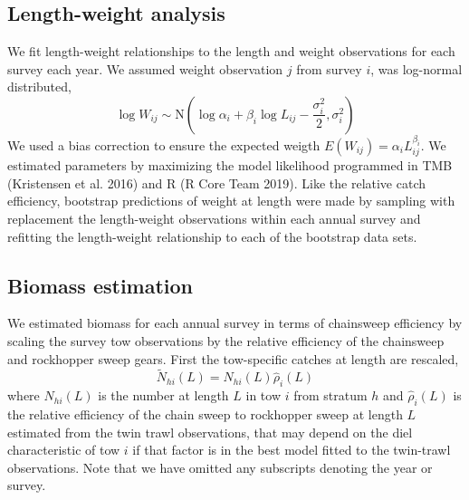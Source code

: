 \documentclass[]{article}
\begin{document}
\hypertarget{length-weight-analysis}{%
\subsection{Length-weight analysis}\label{length-weight-analysis}}

We fit length-weight relationships to the length and weight observations
for each survey each year. We assumed weight observation \(j\) from
survey \(i\), was log-normal distributed, \begin{equation}\label{wal}
 \log W_{ij} \sim \text{N}\left(\log \alpha_i + \beta_i \log L_{ij} - \frac{\sigma_i^2}{2}, \sigma_i^2\right)
\end{equation} We used a bias correction to ensure the expected weigth
\(E(W_{ij})= \alpha_i L_{ij}^{\beta_i}\). We estimated parameters by
maximizing the model likelihood programmed in TMB (Kristensen et al.
2016) and R (R Core Team 2019). Like the relative catch efficiency,
bootstrap predictions of weight at length were made by sampling with
replacement the length-weight observations within each annual survey and
refitting the length-weight relationship to each of the bootstrap data
sets.

\hypertarget{biomass-estimation}{%
\subsection{Biomass estimation}\label{biomass-estimation}}

We estimated biomass for each annual survey in terms of chainsweep
efficiency by scaling the survey tow observations by the relative
efficiency of the chainsweep and rockhopper sweep gears. First the
tow-specific catches at length are rescaled, \begin{equation}\label{nal}
\widetilde N_{hi}\left(L\right) = N_{hi}\left(L\right)\widehat \rho_i\left(L\right)
\end{equation} where \(N_{hi}(L)\) is the number at length \(L\) in tow
\(i\) from stratum \(h\) and \(\widehat \rho_i\left(L\right)\) is the
relative efficiency of the chain sweep to rockhopper sweep at length
\(L\) estimated from the twin trawl observations, that may depend on the
diel characteristic of tow \(i\) if that factor is in the best model
fitted to the twin-trawl observations. Note that we have omitted any
subscripts denoting the year or survey.
\end{document}

